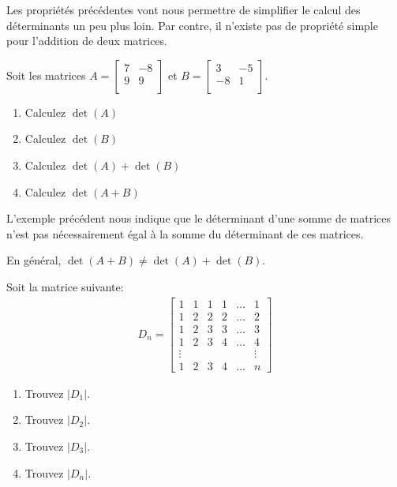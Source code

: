 \documentclass[]{book}
\providecommand{\tightlist}{%
  \setlength{\itemsep}{0pt}\setlength{\parskip}{0pt}}
\theoremstyle{definition}
\theoremstyle{definition}
\theoremstyle{definition}
\theoremstyle{remark}
\let\BeginKnitrBlock\begin \let\EndKnitrBlock\end
\begin{document}
Les propriétés précédentes vont nous permettre de simplifier le calcul des déterminants un peu plus loin. Par contre, il n'existe pas de propriété simple pour l'addition de deux matrices.

\BeginKnitrBlock{example}
\protect\hypertarget{exm:unnamed-chunk-100}{}{\label{exm:unnamed-chunk-100} }Soit les matrices
\(A=\begin{bmatrix} 7&-8\\ 9&9\\ \end{bmatrix}\) et
\(B=\begin{bmatrix} 3&-5\\ -8&1\\ \end{bmatrix}\).

\begin{enumerate}
\def\labelenumi{\alph{enumi}.}
\tightlist
\item
  Calculez \(\det(A)\)
\item
  Calculez \(\det(B)\)
\item
  Calculez \(\det(A)+\det(B)\)
\item
  Calculez \(\det(A+B)\)
\end{enumerate}
\EndKnitrBlock{example}

L'exemple précédent nous indique que le déterminant d'une somme de matrices n'est pas nécessairement égal à la somme du déterminant de ces matrices.

\BeginKnitrBlock{remark}
{}En général, \(\det(A+B)\neq \det(A)+\det(B)\).
\EndKnitrBlock{remark}

\BeginKnitrBlock{example}
\protect\hypertarget{exm:unnamed-chunk-102}{}{\label{exm:unnamed-chunk-102} }Soit la matrice suivante:
\begin{align*}
D_n =\begin{bmatrix}
1 & 1 & 1 & 1 & \ldots & 1 \\
1 & 2 & 2 & 2 & \ldots & 2 \\
1 & 2 & 3 & 3 & \ldots & 3 \\
1 & 2 & 3 & 4 & \ldots & 4 \\
\vdots &&&&& \vdots \\
1 & 2 & 3 & 4 & \ldots & n
\end{bmatrix}
\end{align*}

\begin{enumerate}
\def\labelenumi{\alph{enumi}.}
\tightlist
\item
  Trouvez \(\vert D_1\vert\).
\item
  Trouvez \(\vert D_2\vert\).
\item
  Trouvez \(\vert D_3\vert\).
\item
  Trouvez \(\vert D_n\vert\).
\end{enumerate}
\EndKnitrBlock{example}
\end{document}
